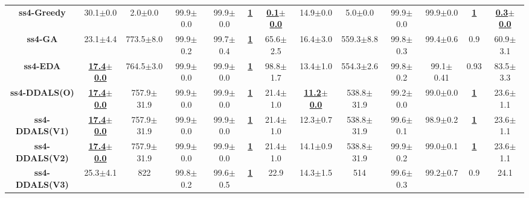 \documentclass[lettersize,journal]{IEEEtran}
\begin{document}
\begin{table}[!t]
{\begin{tabular}{ccccccccccccc}
        \midrule
        {\bfseries ss4-Greedy} &30.1$\pm$0.0 &2.0$\pm$0.0 & 99.9$\pm$0.0 &99.9$\pm$0.0 &\underline{\bfseries 1} &\underline{\bfseries 0.1$\pm$0.0} &14.9$\pm$0.0 &5.0$\pm$0.0 &99.9$\pm$0.0 &99.9$\pm$0.0  &\underline{\bfseries 1} &\underline{\bfseries 0.3$\pm$0.0} \\
        {\bfseries ss4-GA} &23.1$\pm$4.4 &773.5$\pm$8.0 & 99.9$\pm$0.2 &99.7$\pm$0.4 &\underline{\bfseries 1} &65.6$\pm$2.5 &16.4$\pm$3.0 &559.3$\pm$8.8 & 99.8$\pm$0.3 &99.4$\pm$0.6 &0.9 &60.9$\pm$3.1 \\
        {\bfseries ss4-EDA} &\underline{\bfseries 17.4$\pm$0.0} &764.5$\pm$3.0 & 99.9$\pm$0.0 &99.9$\pm$0.0 &\underline{\bfseries 1} &98.8$\pm$1.7 &13.4$\pm$1.0 &554.3$\pm$2.6& 99.8$\pm$0.2&99.1$\pm$0.41 &0.93 &83.5$\pm$3.3 \\
        {\bfseries ss4-DDALS(O)} &\underline{\bfseries 17.4$\pm$0.0} &757.9$\pm$31.9 & 99.9$\pm$0.0 &99.9$\pm$0.0 &\underline{\bfseries 1} &21.4$\pm$1.0 &\underline{\bfseries 11.2$\pm$0.0} &538.8$\pm$31.9 & 99.2$\pm$0.0 &99.0$\pm$0.0  &\underline{\bfseries 1} &23.6$\pm$1.1 \\
        {\bfseries ss4-DDALS(V1)} &\underline{\bfseries 17.4$\pm$0.0} &757.9$\pm$31.9 & 99.9$\pm$0.0 &99.9$\pm$0.0 &\underline{\bfseries 1} &21.4$\pm$1.0 &12.3$\pm$0.7 &538.8$\pm$31.9 & 99.6$\pm$0.1 &98.9$\pm$0.2  &\underline{\bfseries 1} &23.6$\pm$1.1 \\
        {\bfseries ss4-DDALS(V2)} &\underline{\bfseries 17.4$\pm$0.0} &757.9$\pm$31.9 & 99.9$\pm$0.0 &99.9$\pm$0.0 &\underline{\bfseries 1} &21.4$\pm$1.0 &14.1$\pm$0.9 &538.8$\pm$31.9 & 99.9$\pm$0.2 &99.0$\pm$0.1  &\underline{\bfseries 1} &23.6$\pm$1.1 \\
        {\bfseries ss4-DDALS(V3)} &25.3$\pm$4.1 &822 & 99.8$\pm$0.2 &99.6$\pm$0.5 &\underline{\bfseries 1} &22.9 &14.3$\pm$1.5 &514 & 99.6$\pm$0.3 &99.2$\pm$0.7  &0.9 &24.1 \\
        

\end{tabular}}
\end{table}
\end{document}
